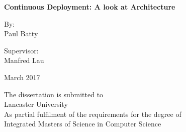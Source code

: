 %
%
%
%
%
%

\begin{titlepage}
	\begin{center}
		\begin{huge}
			\textbf{Continuous Deployment: A look at Architecture}
		\end{huge}	
		
		
		\vspace{3cm}		
		
		\normalsize By:   \\
		\large Paul Batty
		
		\vspace{2.5cm}
		
		\normalsize Supervisor: \\
		\large Manfred Lau
		
		\vspace{1.5cm}
		
		\large March 2017
		
		\vfill 
		
		\normalsize
		The dissertation is submitted to \\
		Lancaster University \\
		As partial fulfilment of the requirements for the degree of \\
		Integrated Masters of Science in Computer Science \\
	\end{center} 
\end{titlepage}
